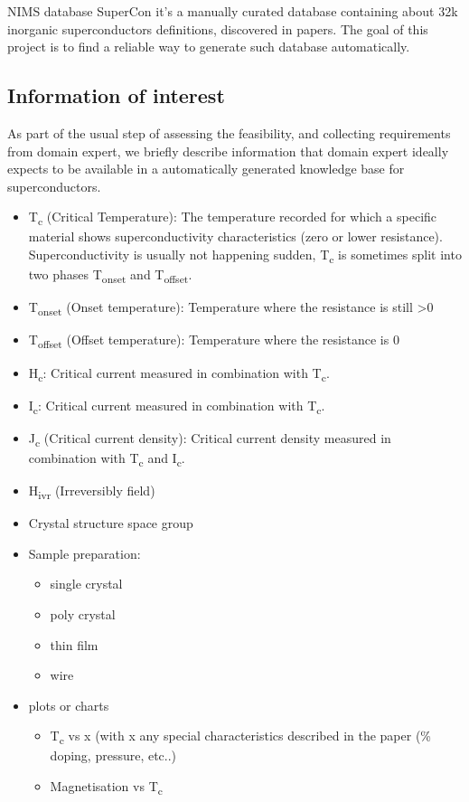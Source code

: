 \documentclass{article}
\begin{document}
NIMS database SuperCon\cite{SuperCon} it's a manually curated database containing about 32k inorganic superconductors definitions, discovered in papers. 
The goal of this project is to find a reliable way to generate such database automatically. 

\subsection{Information of interest}
As part of the usual step of assessing the feasibility, and collecting requirements from domain expert, we briefly describe information that domain expert ideally expects to be available in a automatically generated knowledge base for superconductors. 

\begin{itemize}
    \item T\textsubscript{c} (Critical Temperature): The temperature recorded for which a specific material shows superconductivity characteristics (zero or lower resistance). Superconductivity is usually not happening sudden, T\textsubscript{c} is sometimes split into two phases T\textsubscript{onset} and T\textsubscript{offset}.
    \item T\textsubscript{onset} (Onset temperature): Temperature where the resistance is still \textgreater 0
    \item T\textsubscript{offset} (Offset temperature): Temperature where the resistance is 0
    \item H\textsubscript{c}: Critical current measured in combination with T\textsubscript{c}.
    \item I\textsubscript{c}: Critical current measured in combination with T\textsubscript{c}.
    \item J\textsubscript{c} (Critical current density): Critical current density measured in combination with T\textsubscript{c} and I\textsubscript{c}.
    \item H\textsubscript{ivr} (Irreversibly field) %
    \item Crystal structure space group %
    \item Sample preparation:
    \begin{itemize}
        \item single crystal
        \item poly crystal 
        \item thin film
        \item wire
    \end{itemize}%
    \item plots or charts
    \begin{itemize}
        \item T\textsubscript{c} vs x (with x any special characteristics described in the paper (\% doping, pressure, etc..) 
        \item Magnetisation vs T\textsubscript{c}
    \end{itemize}
\end{itemize}
\end{document}
